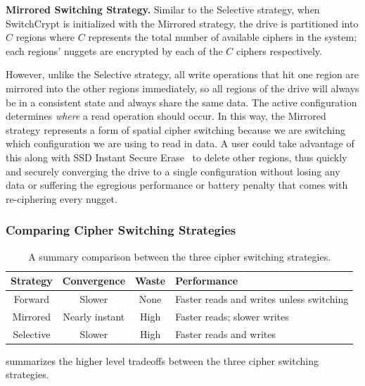 \textbf{Mirrored Switching Strategy.} Similar to the Selective strategy, when
SwitchCrypt is initialized with the Mirrored strategy, the drive is partitioned
into $C$ regions where $C$ represents the total number of available ciphers in
the system; each regions' nuggets are encrypted by each of the $C$ ciphers
respectively.

However, unlike the Selective strategy, all write operations that hit one region
are mirrored into the other regions immediately, so all regions of the drive
will always be in a consistent state and always share the same data. The active
configuration determines \emph{where} a read operation should occur. In this
way, the Mirrored strategy represents a form of spatial cipher switching because
we are switching which configuration we are using to read in data. A user could
take advantage of this along with SSD Instant Secure Erase~\cite{ISE1,ISE2,ISE3}
to delete other regions, thus quickly and securely converging the drive to a
single configuration without losing any data or suffering the egregious
performance or battery penalty that comes with re-ciphering every nugget.

\subsubsection{Comparing Cipher Switching Strategies}

\begin{table}[t]
   \centering
   \begin{tabular}{@{}|c|c|c|C{25mm}|@{}}
      \toprule
      \textbf{Strategy} & \textbf{Convergence} & \textbf{Waste} &
      \textbf{Performance} \\
      \midrule
      Forward   & Slower       & None & Faster reads and writes unless switching
      \\\hline
      Mirrored  & Nearly instant & High & Faster reads; slower writes \\
      \hline
      Selective & Slower       & High & Faster reads and writes  \\
      \hline
   \end{tabular}
   \caption{A summary comparison between the three cipher switching strategies.}
   \label{tbl:strategies-advantages}
\end{table}

 summarizes the higher level tradeoffs between the
three cipher switching strategies.

